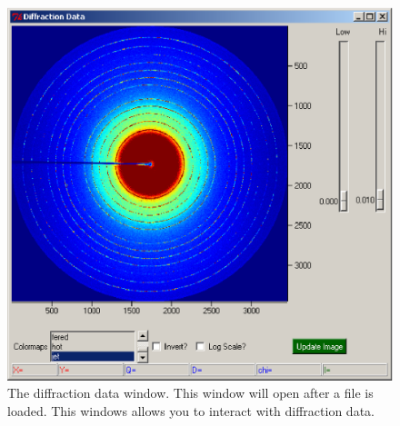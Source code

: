 \begin{figure}
    \centering
    \includegraphics[scale=.75]{figures/diffraction_data_window.eps}
    \caption{The diffraction data window. This 
    window will open after a file is 
    loaded. This windows allows you to interact with diffraction 
    data.} 
    \label{diffraction_data_window}
\end{figure}

